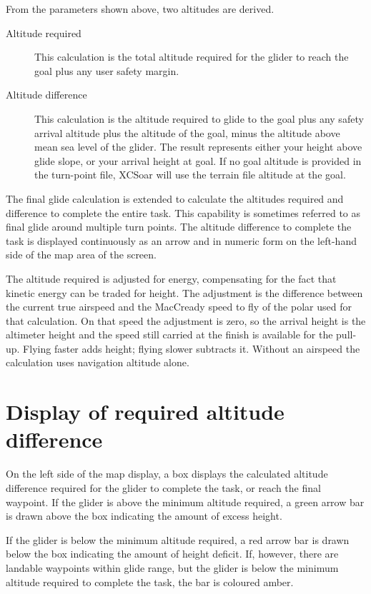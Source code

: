 From the parameters shown above, two altitudes are derived.
\begin{description}
\item[Altitude required]
This calculation is the total altitude required for the glider to
reach the goal plus any user safety margin. 
\item[Altitude difference]
This calculation is the altitude required to glide to the goal plus
any safety arrival altitude plus the altitude of the goal, minus the
altitude above mean sea level of the glider.  The result represents
either your height above glide slope, or your arrival height at goal.
If no goal altitude is provided in the turn-point file, XCSoar will use
the terrain file altitude at the goal.
\end{description}

The final glide calculation is extended to calculate the altitudes
required and difference to complete the entire task.  This capability
is sometimes referred to as final glide around multiple turn points.
The altitude difference to complete the task is displayed continuously
as an arrow and in numeric form on the left-hand side of the map area
of the screen.

The altitude required is adjusted for energy, compensating for
the fact that kinetic energy can be traded for height.  The adjustment
is the difference between the current true airspeed and the MacCready
speed to fly of the polar used for that calculation.  On that speed
the adjustment is zero, so the arrival height is the altimeter height
and the speed still carried at the finish is available for the pull-up.
Flying faster adds height; flying slower subtracts it.  Without an
airspeed the calculation uses navigation altitude alone.


\section{Display of required altitude difference}

On the left side of the map display, a box displays the calculated
altitude difference required for the glider to complete the task, or
reach the final waypoint.  If the glider is above the minimum altitude
required, a green arrow bar is drawn above the box indicating the
amount of excess height.

If the glider is below the minimum altitude required, a red arrow bar is
drawn below the box indicating the amount of height deficit.  If,
however, there are landable waypoints within glide range, but the
glider is below the minimum altitude required to complete the task, the
bar is coloured amber.

